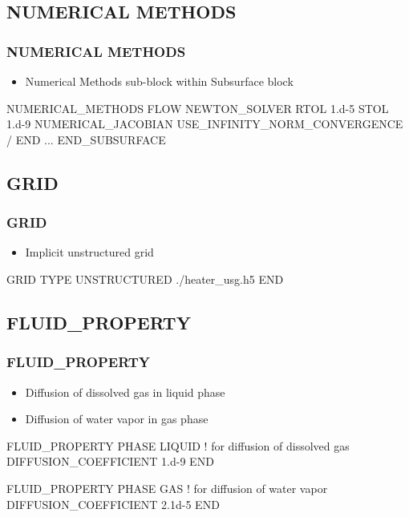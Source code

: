 \documentclass{beamer}
\newcommand\redcomment[1]{{{\color{red} #1}}}
\newcommand\bluecomment[1]{{{\color{blue} #1}}}
\begin{document}
\subsection{NUMERICAL METHODS}

\begin{frame}[fragile]\frametitle{NUMERICAL METHODS}

\begin{itemize}
  \item Numerical Methods sub-block within Subsurface block
\end{itemize}

\begin{semiverbatim}
NUMERICAL_METHODS FLOW
  NEWTON_SOLVER
    RTOL 1.d-5
    STOL 1.d-9
    NUMERICAL_JACOBIAN
    USE_INFINITY_NORM_CONVERGENCE
  /
END
...
END_SUBSURFACE
\end{semiverbatim}

\end{frame}

\subsection{GRID}

\begin{frame}[fragile]\frametitle{GRID}

\begin{itemize}
  \item Implicit \redcomment{unstructured} grid 
\end{itemize}

\begin{semiverbatim}
GRID
  TYPE UNSTRUCTURED ./heater_usg.h5
END
\end{semiverbatim}

\end{frame}

\subsection{FLUID\_PROPERTY}

\begin{frame}[fragile]\frametitle{FLUID\_PROPERTY}
\begin{itemize}
  \item Diffusion of dissolved gas in \redcomment{liquid phase}
  \item Diffusion of water vapor in \redcomment{gas phase}
\end{itemize}

\begin{semiverbatim}

FLUID_PROPERTY
  PHASE LIQUID \bluecomment{! for diffusion of dissolved gas}
  DIFFUSION_COEFFICIENT 1.d-9
END

FLUID_PROPERTY
  PHASE GAS \bluecomment{! for diffusion of water vapor}
  DIFFUSION_COEFFICIENT 2.1d-5
END
\end{semiverbatim}

\end{frame}
\end{document}
